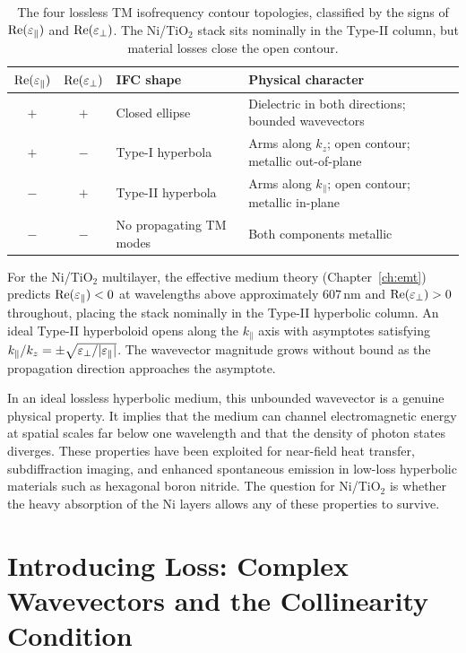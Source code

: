 \begin{table}[h]
\centering
\caption{The four lossless TM isofrequency contour topologies, classified
  by the signs of $\operatorname{Re}(\varepsilon_{\parallel})$ and $\operatorname{Re}(\varepsilon_{\perp})$. The Ni/TiO$_2$ stack sits
  nominally in the Type-II column, but material losses close the open contour.}
\label{tab:ch2_ifc_regimes}
\begin{tabular}{cclp{5cm}}
\toprule
$\operatorname{Re}(\varepsilon_{\parallel})$ & $\operatorname{Re}(\varepsilon_{\perp})$ & IFC shape & Physical character \\
\midrule
$+$ & $+$ & Closed ellipse   & Dielectric in both directions; bounded
                                wavevectors \\
$+$ & $-$ & Type-I hyperbola & Arms along $k_z$; open contour; metallic
                                out-of-plane \\
$-$ & $+$ & Type-II hyperbola & Arms along $k_\parallel$; open contour; metallic
                                in-plane \\
$-$ & $-$ & No propagating TM modes & Both components metallic \\
\bottomrule
\end{tabular}
\end{table}

For the Ni/TiO$_2$ multilayer, the effective medium theory (Chapter~\ref{ch:emt})
predicts $\operatorname{Re}(\varepsilon_{\parallel}) < 0$ at wavelengths above approximately $607$\,nm and
$\operatorname{Re}(\varepsilon_{\perp}) > 0$ throughout, placing the stack nominally in the Type-II
hyperbolic column. An ideal Type-II hyperboloid opens along the $k_\parallel$
axis with asymptotes satisfying $k_\parallel/k_z = \pm\sqrt{\varepsilon_{\perp}/|\varepsilon_{\parallel}|}$.
The wavevector magnitude grows without bound as the propagation direction
approaches the asymptote.

In an ideal lossless hyperbolic medium, this unbounded wavevector is a genuine
physical property. It implies that the medium can channel electromagnetic energy
at spatial scales far below one wavelength and that the density of photon states
diverges. These properties have been exploited for near-field heat transfer,
subdiffraction imaging, and enhanced spontaneous emission in low-loss hyperbolic
materials such as hexagonal boron nitride. The question for Ni/TiO$_2$ is
whether the heavy absorption of the Ni layers allows any of these properties
to survive.

\section{Introducing Loss: Complex Wavevectors and the Collinearity Condition}

